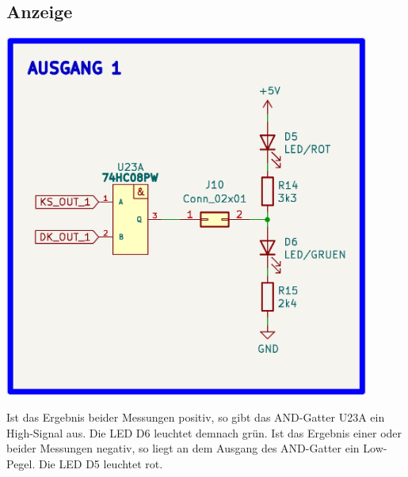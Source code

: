 \newpage
\subsection{Anzeige}

\begin{center}
\includegraphics[width=12cm]{Bilder/Anzeige.png}
\end{center}


Ist das Ergebnis beider Messungen positiv, so gibt das AND-Gatter U23A ein High-Signal aus. Die LED D6 leuchtet demnach grün. 
Ist das Ergebnis einer oder beider Messungen negativ, so liegt an dem Ausgang des AND-Gatter ein Low-Pegel. Die LED D5 leuchtet rot.

